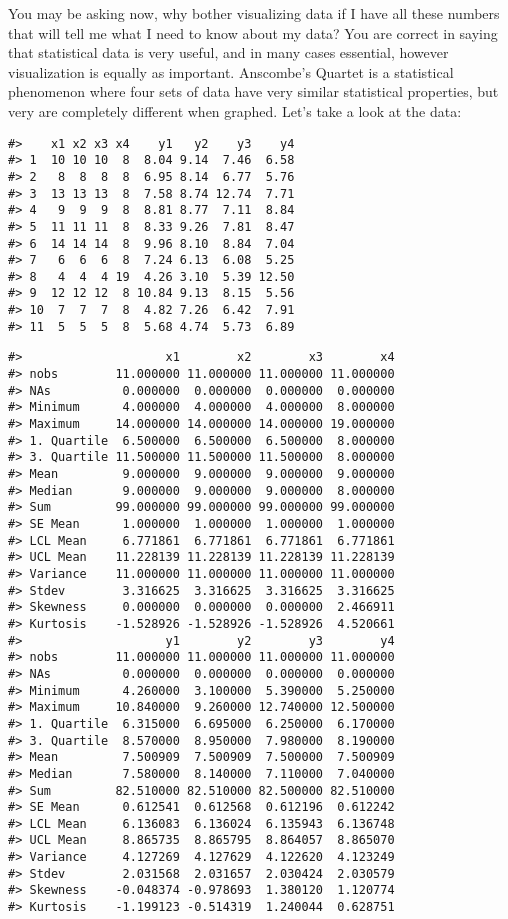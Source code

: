 \documentclass[
]{book}
\begin{document}
You may be asking now, why bother visualizing data if I have all these numbers that will tell me what I need to know about my data? You are correct in saying that statistical data is very useful, and in many cases essential, however visualization is equally as important. Anscombe's Quartet is a statistical phenomenon where four sets of data have very similar statistical properties, but very are completely different when graphed. Let's take a look at the data:

\begin{verbatim}
#>    x1 x2 x3 x4    y1   y2    y3    y4
#> 1  10 10 10  8  8.04 9.14  7.46  6.58
#> 2   8  8  8  8  6.95 8.14  6.77  5.76
#> 3  13 13 13  8  7.58 8.74 12.74  7.71
#> 4   9  9  9  8  8.81 8.77  7.11  8.84
#> 5  11 11 11  8  8.33 9.26  7.81  8.47
#> 6  14 14 14  8  9.96 8.10  8.84  7.04
#> 7   6  6  6  8  7.24 6.13  6.08  5.25
#> 8   4  4  4 19  4.26 3.10  5.39 12.50
#> 9  12 12 12  8 10.84 9.13  8.15  5.56
#> 10  7  7  7  8  4.82 7.26  6.42  7.91
#> 11  5  5  5  8  5.68 4.74  5.73  6.89
\end{verbatim}

\begin{verbatim}
#>                    x1        x2        x3        x4
#> nobs        11.000000 11.000000 11.000000 11.000000
#> NAs          0.000000  0.000000  0.000000  0.000000
#> Minimum      4.000000  4.000000  4.000000  8.000000
#> Maximum     14.000000 14.000000 14.000000 19.000000
#> 1. Quartile  6.500000  6.500000  6.500000  8.000000
#> 3. Quartile 11.500000 11.500000 11.500000  8.000000
#> Mean         9.000000  9.000000  9.000000  9.000000
#> Median       9.000000  9.000000  9.000000  8.000000
#> Sum         99.000000 99.000000 99.000000 99.000000
#> SE Mean      1.000000  1.000000  1.000000  1.000000
#> LCL Mean     6.771861  6.771861  6.771861  6.771861
#> UCL Mean    11.228139 11.228139 11.228139 11.228139
#> Variance    11.000000 11.000000 11.000000 11.000000
#> Stdev        3.316625  3.316625  3.316625  3.316625
#> Skewness     0.000000  0.000000  0.000000  2.466911
#> Kurtosis    -1.528926 -1.528926 -1.528926  4.520661
#>                    y1        y2        y3        y4
#> nobs        11.000000 11.000000 11.000000 11.000000
#> NAs          0.000000  0.000000  0.000000  0.000000
#> Minimum      4.260000  3.100000  5.390000  5.250000
#> Maximum     10.840000  9.260000 12.740000 12.500000
#> 1. Quartile  6.315000  6.695000  6.250000  6.170000
#> 3. Quartile  8.570000  8.950000  7.980000  8.190000
#> Mean         7.500909  7.500909  7.500000  7.500909
#> Median       7.580000  8.140000  7.110000  7.040000
#> Sum         82.510000 82.510000 82.500000 82.510000
#> SE Mean      0.612541  0.612568  0.612196  0.612242
#> LCL Mean     6.136083  6.136024  6.135943  6.136748
#> UCL Mean     8.865735  8.865795  8.864057  8.865070
#> Variance     4.127269  4.127629  4.122620  4.123249
#> Stdev        2.031568  2.031657  2.030424  2.030579
#> Skewness    -0.048374 -0.978693  1.380120  1.120774
#> Kurtosis    -1.199123 -0.514319  1.240044  0.628751
\end{verbatim}
\end{document}
